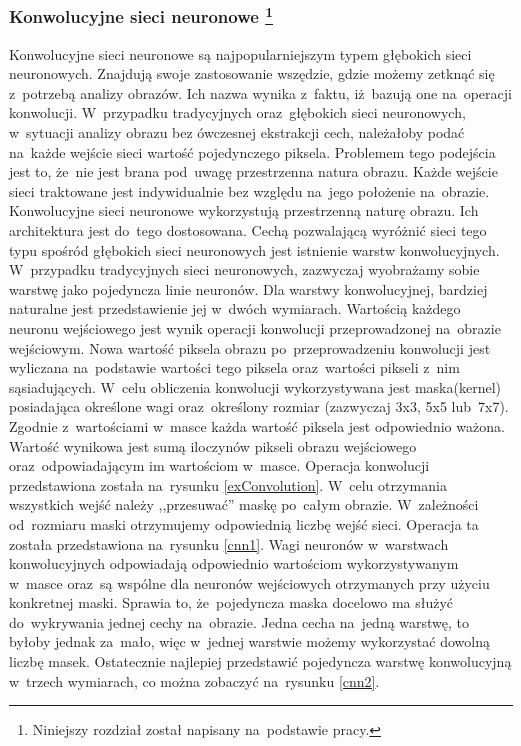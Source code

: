 \subsubsection[Konwolucyjne sieci neuronowe]{Konwolucyjne sieci neuronowe \footnote{Niniejszy rozdział został napisany na~podstawie pracy\cite{nielsen}.}}
Konwolucyjne sieci neuronowe są najpopularniejszym typem głębokich sieci neuronowych. Znajdują swoje zastosowanie wszędzie, gdzie możemy zetknąć się z~potrzebą analizy obrazów. Ich nazwa wynika z~faktu, iż~bazują one na~operacji konwolucji. W~przypadku tradycyjnych oraz~głębokich sieci neuronowych, w~sytuacji analizy obrazu bez ówczesnej ekstrakcji cech, należałoby podać na~każde wejście sieci wartość pojedynczego piksela. Problemem tego podejścia jest to, że~nie jest brana pod~uwagę przestrzenna natura obrazu. Każde wejście sieci traktowane jest indywidualnie bez względu na~jego położenie na~obrazie.  Konwolucyjne sieci neuronowe wykorzystują przestrzenną naturę obrazu. Ich architektura jest do~tego dostosowana. Cechą pozwalającą wyróżnić sieci tego typu spośród głębokich sieci neuronowych jest istnienie warstw konwolucyjnych. W~przypadku tradycyjnych sieci neuronowych, zazwyczaj wyobrażamy sobie warstwę jako pojedyncza linie neuronów. Dla warstwy konwolucyjnej, bardziej naturalne jest przedstawienie jej w~dwóch wymiarach. Wartością każdego neuronu wejściowego jest wynik operacji konwolucji przeprowadzonej na~obrazie wejściowym.  Nowa wartość piksela obrazu po~przeprowadzeniu konwolucji jest wyliczana na~podstawie wartości tego piksela oraz~wartości pikseli z~nim sąsiadujących. W~celu obliczenia konwolucji wykorzystywana jest maska(kernel) posiadająca określone wagi oraz~określony rozmiar (zazwyczaj 3x3, 5x5 lub~7x7). Zgodnie z~wartościami w~masce każda wartość piksela jest odpowiednio ważona. Wartość wynikowa jest sumą iloczynów pikseli obrazu wejściowego oraz~odpowiadającym im wartościom w~masce. Operacja konwolucji przedstawiona została na~rysunku \ref{exConvolution}. W~celu otrzymania wszystkich wejść należy ,,przesuwać'' maskę po~całym obrazie. W~zależności od~rozmiaru maski otrzymujemy odpowiednią liczbę wejść sieci. Operacja ta została przedstawiona na~rysunku \ref{cnn1}. Wagi neuronów w~warstwach konwolucyjnych odpowiadają odpowiednio wartościom wykorzystywanym w~masce oraz~są wspólne dla neuronów wejściowych otrzymanych przy użyciu konkretnej maski. Sprawia to, że~pojedyncza maska docelowo ma służyć do~wykrywania jednej cechy na~obrazie.  Jedna cecha na~jedną warstwę, to byłoby jednak za~mało, więc w~jednej warstwie możemy wykorzystać dowolną liczbę masek. Ostatecznie najlepiej przedstawić pojedyncza warstwę konwolucyjną w~trzech wymiarach, co można zobaczyć na~rysunku \ref{cnn2}.

